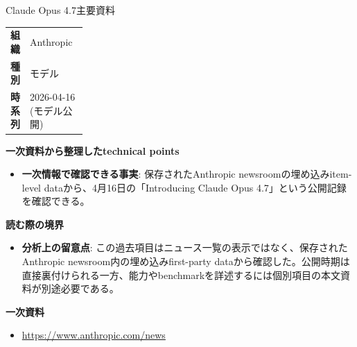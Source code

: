 \begin{technicalnote}{Claude Opus 4.7}{主要資料}
\begingroup
\begin{tabularx}{\linewidth}{@{}>{\bfseries}p{0.22\linewidth}X@{}}
組織 & Anthropic \\
種別 & モデル \\
時系列 & 2026-04-16 (モデル公開) \\
\end{tabularx}
\smallskip
{\bfseries 一次資料から整理したtechnical points}
\begin{itemize}[leftmargin=1.5em,itemsep=0.35em]
\item \textbf{一次情報で確認できる事実}: 保存されたAnthropic newsroomの埋め込みitem-level dataから、4月16日の「Introducing Claude Opus 4.7」という公開記録を確認できる。
\end{itemize}
\begin{minipage}{\linewidth}
{\bfseries 読む際の境界}
\begin{itemize}[leftmargin=1.5em,itemsep=0.35em]
\item \textbf{分析上の留意点}: この過去項目はニュース一覧の表示ではなく、保存されたAnthropic newsroom内の埋め込みfirst-party dataから確認した。公開時期は直接裏付けられる一方、能力やbenchmarkを詳述するには個別項目の本文資料が別途必要である。
\end{itemize}
\begin{samepage}
{\bfseries 一次資料}
\begingroup\sloppy
\begin{itemize}[leftmargin=1.5em,itemsep=0.25em]
\item {\scriptsize\url{https://www.anthropic.com/news}}
\end{itemize}
\endgroup
\end{samepage}
\end{minipage}
\endgroup
\end{technicalnote}
\medskip

